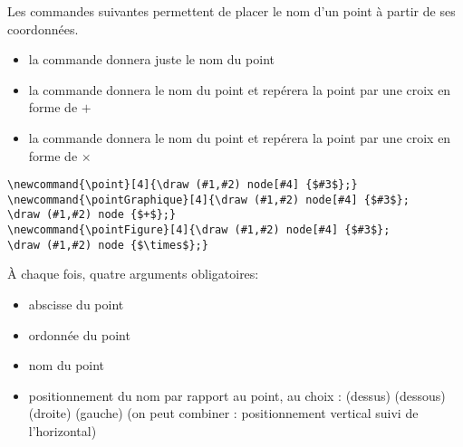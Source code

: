 \documentclass[nocrop]{sesamanuel}
\begin{document}
\clearpage
\begin{syntaxe}
Les commandes suivantes permettent de placer le nom d'un point à partir de ses coordonnées. 
\begin{itemize}
 \item la commande  donnera juste le nom du point
 \item la commande  donnera le nom du point et repérera la point par une croix en forme de $+$
 \item la commande  donnera le nom du point et repérera la point par une croix en forme de $\times$
\end{itemize}

 
\begin{verbatim}
\newcommand{\point}[4]{\draw (#1,#2) node[#4] {$#3$};}
\newcommand{\pointGraphique}[4]{\draw (#1,#2) node[#4] {$#3$};
\draw (#1,#2) node {$+$};}
\newcommand{\pointFigure}[4]{\draw (#1,#2) node[#4] {$#3$};
\draw (#1,#2) node {$\times$};}
 \end{verbatim}

\`A chaque fois, quatre arguments obligatoires: 

\begin{itemize}
 \item abscisse du point
 \item ordonnée du point
 \item nom du point
 \item positionnement du nom par rapport au point, au choix :  (dessus)  (dessous)  (droite)  (gauche) (on peut combiner :  positionnement vertical suivi de l'horizontal)
\end{itemize}

\end{syntaxe}
\end{document}
